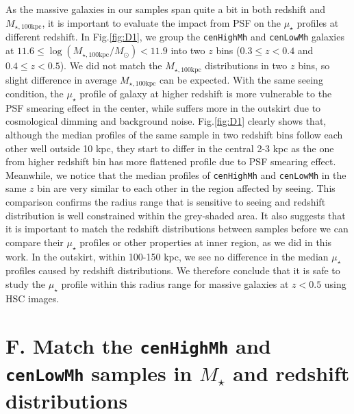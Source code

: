 \documentclass{emulateapj}
\def\rbcg{\texttt{cenHighMh}}
\def\nbcg{\texttt{cenLowMh}}
\def\mstar{{$M_{\star}$}}
\def\mtot{{$M_{\star,100\mathrm{kpc}}$}}
\def\logmtot{{$\log (M_{\star,100\mathrm{kpc}}/M_{\odot})$}}
\def\mden{{$\mu_{\star}$}}
\begin{document}
\begin{CJK*}{UTF8}{gbsn}
    As the massive galaxies in our samples span quite a bit in both redshift and \mtot{}, 
    it is important to evaluate the impact from PSF on the \mden{} profiles at different 
    redshift. 
    In Fig.\ref{fig:D1}, we group the \rbcg{} and \nbcg{} galaxies at  
    $11.6 \le$\logmtot$< 11.9$ into two $z$ bins ($0.3\leq z<0.4$ and 
    $0.4\leq z<0.5$). 
    We did not match the \mtot{} distributions in two $z$ bins, so slight difference in 
    average \mtot{} can be expected. 
    With the same seeing condition, the \mden{} profile of galaxy at higher redshift is 
    more vulnerable to the PSF smearing effect in the center, while suffers more in the 
    outskirt due to cosmological dimming and background noise.  
    Fig.\ref{fig:D1} clearly shows that, although the median profiles of the same sample 
    in two redshift bins follow each other well outside 10 kpc, they start to differ in 
    the central 2-3 kpc as the one from higher redshift bin has more flattened profile 
    due to PSF smearing effect.  
    Meanwhile, we notice that the median profiles of \rbcg{} and \nbcg{} in the 
    same $z$ bin are very similar to each other in the region affected by seeing.   
    This comparison confirms the radius range that is sensitive to seeing and 
    redshift distribution is well constrained within the grey-shaded area.
    It also suggests that it is important to match the redshift distributions between 
    samples before we can compare their \mden{} profiles or other properties at inner 
    region, as we did in this work. 
    In the outskirt, within 100-150 kpc, we see no difference in the median \mden{} 
    profiles caused by redshift distributions. 
    We therefore conclude that it is safe to study the \mden{} profile within this 
    radius range for massive galaxies at $z<0.5$ using HSC images. 

\section{F. Match the \rbcg{} and \nbcg{} samples in \mstar{} and redshift distributions}
    \label{app:match}


\end{CJK*}
\end{document}
